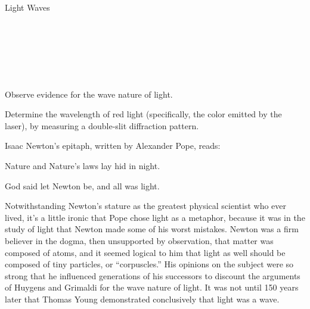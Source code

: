 \begin{lab}{Light Waves}\label{lab:light-waves}

\apparatus
{}\\
\\
\\
\\
\\

\begin{goals}

\item[] Observe evidence for the wave nature of light.

\item[] Determine the wavelength of red light (specifically, the
color emitted by the laser), by measuring a double-slit
diffraction pattern.

\end{goals}


Isaac Newton's epitaph, written by Alexander Pope, reads:

   Nature and Nature's laws lay hid in night.

   God said let Newton be, and all was light.

Notwithstanding Newton's stature as the greatest physical
scientist who ever lived, it's a little ironic that Pope
chose light as a metaphor, because it was in the study of
light that Newton made some of his worst mistakes. Newton
was a firm believer in the dogma, then unsupported by
observation, that matter was composed of atoms, and it
seemed logical to him that light as well should be composed
of tiny particles, or ``corpuscles.'' His opinions on the
subject were so strong that he influenced generations of his
successors to discount the arguments of Huygens and Grimaldi
for the wave nature of light. It was not until 150 years
later that Thomas Young demonstrated conclusively that light was a wave.



\end{lab}
